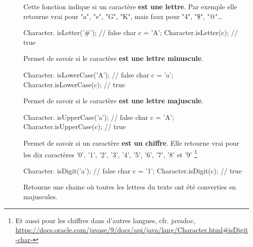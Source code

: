 	\begin{description}
	
		\item[]
			Cette fonction indique si un caractère \textbf{est une lettre}. 
		Par exemple elle retourne vrai pour "a", "e", "G", "K", 
		mais faux pour "4", "\$", "@"\dots %


		\begin{java}
Character. isLetter('#');  // false
char c = 'A';
Character.isLetter(c);   // true			
		\end{java}
	
	
	\item[]	
		Permet de savoir si le caractère \textbf{est une lettre minuscule}.


		\begin{java}
Character. isLowerCase('A');  // false
char c = 'a';
Character.isLowerCase(c);   // true			
		\end{java}

	\item[]	
		Permet de savoir si le caractère \textbf{est une lettre majuscule}.
		

		\begin{java}
Character. isUpperCase('a');  // false
char c = 'A';
Character.isUpperCase(c);   // true			
		\end{java}
	

	\item[]	
		Permet de savoir si un caractère \textbf{est un chiffre}. 
		Elle retourne vrai pour les dix caractères 
		'0', '1', '2', '3', '4', '5', '6', '7', '8' et '9'%
		\footnote{%
			Et aussi pour les chiffres dans d'autres langues, cfr. javadoc, 
			\url{https://docs.oracle.com/javase/9/docs/api/java/lang/Character.html#isDigit-char-}
		}

		\begin{java}
Character. isDigit('a');  // false
char c = '1';
Character.isDigit(c);   // true			
		\end{java}
	
	\item[]
		Retourne une chaine où toutes les lettres du texte
		ont été converties en majuscules.


\end{description}
